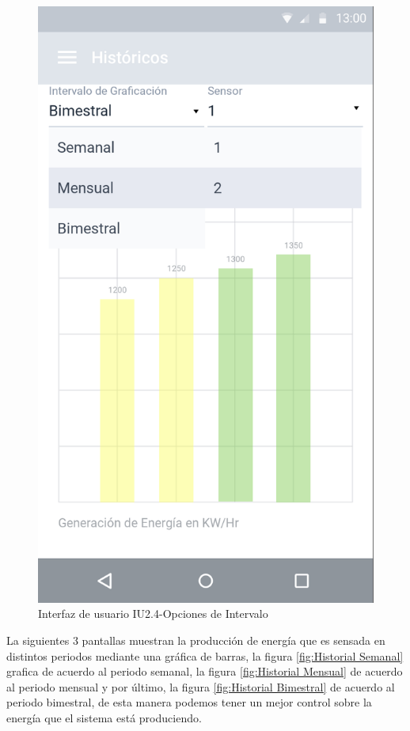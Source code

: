 \begin{figure}[H]
	\centering
	\includegraphics[scale=0.70]{Capitulo4/software/submodulos/images/opciones_hist.png}
	\caption{Interfaz de usuario IU2.4-Opciones de Intervalo}
	\label{fig:Opciones de Intervalo}
\end{figure}

La siguientes 3 pantallas muestran la producción de energía que es sensada en distintos periodos mediante una gráfica de barras, la figura \ref{fig:Historial Semanal} grafica de acuerdo al periodo semanal, la figura \ref{fig:Historial Mensual} de acuerdo al periodo mensual y por último, la figura \ref{fig:Historial Bimestral} de acuerdo al periodo bimestral, de esta manera podemos tener un mejor control sobre la energía que el sistema está produciendo. 


